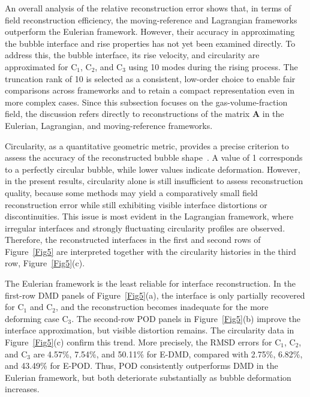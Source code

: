 \documentclass[a4paper,fleqn]{cas-sc}
\begin{document}
	An overall analysis of the relative reconstruction error shows that, in terms of field reconstruction efficiency, the moving-reference and Lagrangian frameworks outperform the Eulerian framework. However, their accuracy in approximating the bubble interface and rise properties has not yet been examined directly. To address this, the bubble interface, its rise velocity, and circularity are approximated for C$_1$, C$_2$, and C$_3$ using 10 modes during the rising process. The truncation rank of 10 is selected as a consistent, low-order choice to enable fair comparisons across frameworks and to retain a compact representation even in more complex cases. Since this subsection focuses on the gas-volume-fraction field, the discussion refers directly to reconstructions of the matrix $\mathbf{A}$ in the Eulerian, Lagrangian, and moving-reference frameworks.
	
	Circularity, as a quantitative geometric metric, provides a precise criterion to assess the accuracy of the reconstructed bubble shape~\cite{Hysing2009}. A value of 1 corresponds to a perfectly circular bubble, while lower values indicate deformation. However, in the present results, circularity alone is still insufficient to assess reconstruction quality, because some methods may yield a comparatively small field reconstruction error while still exhibiting visible interface distortions or discontinuities. This issue is most evident in the Lagrangian framework, where irregular interfaces and strongly fluctuating circularity profiles are observed. Therefore, the reconstructed interfaces in the first and second rows of Figure~\ref{Fig5} are interpreted together with the circularity histories in the third row, Figure~\ref{Fig5}(c).

	The Eulerian framework is the least reliable for interface reconstruction. In the first-row DMD panels of Figure~\ref{Fig5}(a), the interface is only partially recovered for C$_1$ and C$_2$, and the reconstruction becomes inadequate for the more deforming case C$_3$. The second-row POD panels in Figure~\ref{Fig5}(b) improve the interface approximation, but visible distortion remains. The circularity data in Figure~\ref{Fig5}(c) confirm this trend. More precisely, the RMSD errors for C$_1$, C$_2$, and C$_3$ are 4.57\%, 7.54\%, and 50.11\% for E-DMD, compared with 2.75\%, 6.82\%, and 43.49\% for E-POD. Thus, POD consistently outperforms DMD in the Eulerian framework, but both deteriorate substantially as bubble deformation increases.
	
\end{document}
